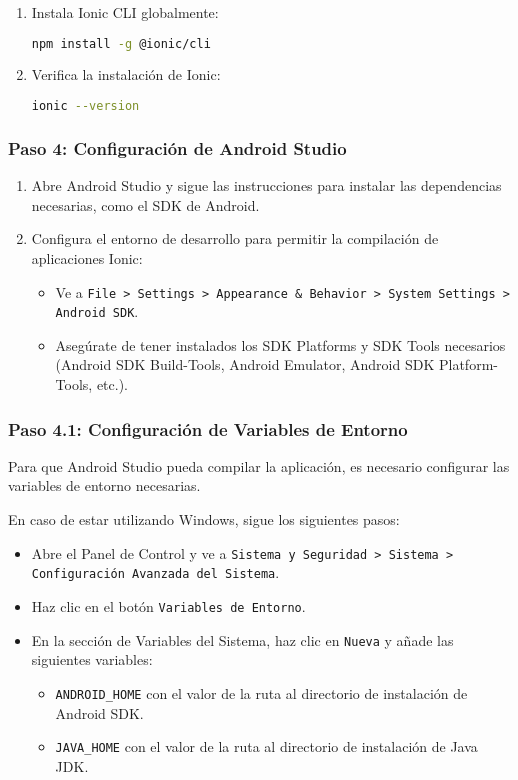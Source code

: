 \begin{enumerate}
	\item Instala Ionic CLI globalmente:
	      \begin{lstlisting}[language=bash]
    npm install -g @ionic/cli
    \end{lstlisting}
	\item Verifica la instalación de Ionic:
	      \begin{lstlisting}[language=bash]
    ionic --version
    \end{lstlisting}
\end{enumerate}

\subsubsection{Paso 4: Configuración de Android Studio}

\begin{enumerate}
	\item Abre Android Studio y sigue las instrucciones para instalar las dependencias necesarias, como el SDK de Android.
	\item Configura el entorno de desarrollo para permitir la compilación de aplicaciones Ionic:
	      \begin{itemize}
		      \item Ve a \texttt{File > Settings > Appearance \& Behavior > System Settings > Android SDK}.
		      \item Asegúrate de tener instalados los SDK Platforms y SDK Tools necesarios (Android SDK Build-Tools, Android Emulator, Android SDK Platform-Tools, etc.).
	      \end{itemize}
\end{enumerate}

\subsubsection{Paso 4.1: Configuración de Variables de Entorno}
Para que Android Studio pueda compilar la aplicación, es necesario configurar las variables de entorno necesarias.

En caso de estar utilizando Windows, sigue los siguientes pasos:
\begin {itemize}
\item Abre el Panel de Control y ve a \texttt{Sistema y Seguridad > Sistema > Configuración Avanzada del Sistema}.
\item Haz clic en el botón \texttt{Variables de Entorno}.
\item En la sección de Variables del Sistema, haz clic en \texttt{Nueva} y añade las siguientes variables:
\begin{itemize}
	\item \texttt{ANDROID\_HOME} con el valor de la ruta al directorio de instalación de Android SDK.
	\item \texttt{JAVA\_HOME} con el valor de la ruta al directorio de instalación de Java JDK.
\end{itemize}
\end{itemize}

